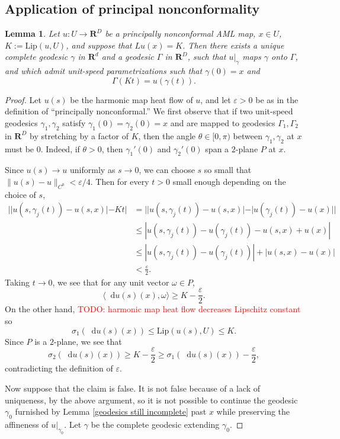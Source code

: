 \documentclass[reqno,11pt]{amsart}
\newcommand{\RR}{\mathbf{R}}
\newcommand*\dif{\mathop{}\!\mathrm{d}}
\newcommand{\Lip}{\mathrm{Lip}}
\newtheorem{lemma}[theorem]{Lemma}
\theoremstyle{definition}
\numberwithin{equation}{section}
\newcommand\todo[1]{\textcolor{red}{TODO: #1}}
\begin{document}
\subsection{Application of principal nonconformality}
\begin{lemma}
Let $u: U \to \RR^D$ be a principally nonconformal AML map, $x \in U$, $K := \Lip(u, U)$, and suppose that $Lu(x) = K$.
Then there exists a unique complete geodesic $\gamma$ in $\RR^d$ and a geodesic $\Gamma$ in $\RR^D$, such that $u|_\gamma$ maps $\gamma$ onto $\Gamma$, and which admit unit-speed parametrizations such that $\gamma(0) = x$ and
$$\Gamma(Kt) = u(\gamma(t)).$$
\end{lemma}
\begin{proof}
Let $u(s)$ be the harmonic map heat flow of $u$, and let $\varepsilon > 0$ be as in the definition of ``principally nonconformal.''
We first observe that if two unit-speed geodesics $\gamma_1, \gamma_2$ satisfy $\gamma_1(0) = \gamma_2(0) = x$ and are mapped to geodesics $\Gamma_1, \Gamma_2$ in $\RR^D$ by stretching by a factor of $K$, then the angle $\theta \in [0, \pi)$ between $\gamma_1, \gamma_2$ at $x$ must be $0$.
Indeed, if $\theta > 0$, then $\gamma_1'(0)$ and $\gamma_2'(0)$ span a $2$-plane $P$ at $x$.

Since $u(s) \to u$ uniformly as $s \to 0$, we can choose $s$ so small that $\|u(s) - u\|_{C^0} < \varepsilon/4$.
Then for every $t > 0$ small enough depending on the choice of $s$,
\begin{align*}
||u(s, \gamma_j(t)) - u(s, x)| - Kt| 
&= ||u(s, \gamma_j(t)) - u(s, x)| - |u(\gamma_j(t)) - u(x)|| \\
&\leq |u(s, \gamma_j(t)) - u(\gamma_j(t)) - u(s, x) + u(x)| \\
&\leq |u(s, \gamma_j(t)) - u(\gamma_j(t))| + |u(s, x) - u(x)| \\
&< \frac{\varepsilon}{2}.
\end{align*}
Taking $t \to 0$, we see that for any unit vector $\omega \in P$,
$$\langle \dif u(s)(x), \omega\rangle \geq K - \frac{\varepsilon}{2}.$$
On the other hand, \todo{harmonic map heat flow decreases Lipschitz constant} so
$$\sigma_1(\dif u(s)(x)) \leq \Lip(u(s), U) \leq K.$$
Since $P$ is a $2$-plane, we see that
$$\sigma_2(\dif u(s)(x)) \geq K - \frac{\varepsilon}{2} \geq \sigma_1(\dif u(s)(x)) - \frac{\varepsilon}{2},$$
contradicting the definition of $\varepsilon$.

Now suppose that the claim is false.
It is not false because of a lack of uniqueness, by the above argument, so it is not possible to continue the geodesic $\gamma_0$ furnished by Lemma \ref{geodesics still incomplete} past $x$ while preserving the affineness of $u|_{\gamma_0}$.
Let $\gamma$ be the complete geodesic extending $\gamma_0$.


\end{proof}
\end{document}
